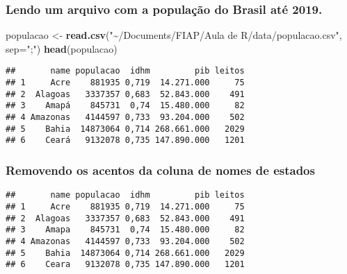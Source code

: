 \documentclass[
]{article}
\newenvironment{Shaded}{\begin{snugshade}}{\end{snugshade}}
\newcommand{\DataTypeTok}[1]{\textcolor[rgb]{0.13,0.29,0.53}{#1}}
\newcommand{\KeywordTok}[1]{\textcolor[rgb]{0.13,0.29,0.53}{\textbf{#1}}}
\newcommand{\NormalTok}[1]{#1}
\newcommand{\OperatorTok}[1]{\textcolor[rgb]{0.81,0.36,0.00}{\textbf{#1}}}
\newcommand{\StringTok}[1]{\textcolor[rgb]{0.31,0.60,0.02}{#1}}
\begin{document}
\hypertarget{htmlwidget-db579496360331ca24db}{}
\begin{leaflet}

\end{leaflet}

\hypertarget{lendo-um-arquivo-com-a-populauxe7uxe3o-do-brasil-atuxe9-2019.}{%
\subsubsection{Lendo um arquivo com a população do Brasil até
2019.}\label{lendo-um-arquivo-com-a-populauxe7uxe3o-do-brasil-atuxe9-2019.}}

\begin{Shaded}
\begin{Highlighting}[]
\NormalTok{populacao \textless{}{-}}\StringTok{ }\KeywordTok{read.csv}\NormalTok{(}\StringTok{"\textasciitilde{}/Documents/FIAP/Aula de R/data/populacao.csv"}\NormalTok{, }\DataTypeTok{sep=}\StringTok{";"}\NormalTok{)}
\KeywordTok{head}\NormalTok{(populacao)}
\end{Highlighting}
\end{Shaded}

\begin{verbatim}
##       name populacao  idhm         pib leitos
## 1     Acre    881935 0,719  14.271.000     75
## 2  Alagoas   3337357 0,683  52.843.000    491
## 3    Amapá    845731  0,74  15.480.000     82
## 4 Amazonas   4144597 0,733  93.204.000    502
## 5    Bahia  14873064 0,714 268.661.000   2029
## 6    Ceará   9132078 0,735 147.890.000   1201
\end{verbatim}

\hypertarget{removendo-os-acentos-da-coluna-de-nomes-de-estados}{%
\subsubsection{Removendo os acentos da coluna de nomes de
estados}\label{removendo-os-acentos-da-coluna-de-nomes-de-estados}}

\begin{Shaded}
\end{Shaded}

\begin{verbatim}
##       name populacao  idhm         pib leitos
## 1     Acre    881935 0,719  14.271.000     75
## 2  Alagoas   3337357 0,683  52.843.000    491
## 3    Amapa    845731  0,74  15.480.000     82
## 4 Amazonas   4144597 0,733  93.204.000    502
## 5    Bahia  14873064 0,714 268.661.000   2029
## 6    Ceara   9132078 0,735 147.890.000   1201
\end{verbatim}
\end{document}

